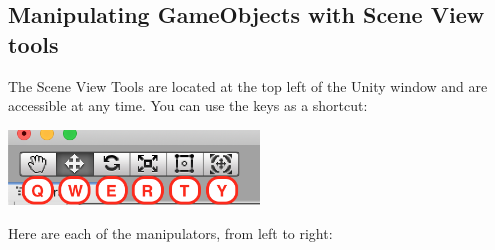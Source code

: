 \documentclass[11pt]{article}
\begin{document}
\subsection{Manipulating GameObjects with Scene View tools}

The Scene View Tools are located at the top left of the Unity window and are accessible at any time.  You can use the  keys as a shortcut:

\begin{center}
\includegraphics[width=0.5\textwidth]{scene-view-tools}
\end{center}

\noindent Here are each of the manipulators, from left to right:
\end{document}
